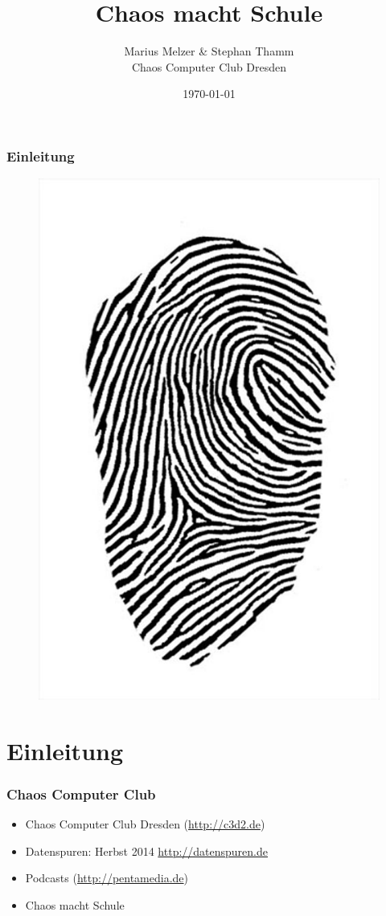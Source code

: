 \documentclass[12pt]{beamer}
\title{Chaos macht Schule}
\author{\small Marius Melzer \& Stephan Thamm\\\large Chaos Computer Club Dresden}
\date{\today}
\begin{document}
\maketitle


\begin{frame}
  \frametitle{Einleitung}
  \begin{figure}
    \includegraphics[height=0.7\textheight]{img/fingerabdruck.jpg}
  \end{figure}
\end{frame}


\section{Einleitung}
\begin{frame}
    \frametitle{Chaos Computer Club}
    \begin{itemize}
      \item<1-> Chaos Computer Club Dresden (\url{http://c3d2.de})
          \note{}
      \item<2-> Datenspuren: Herbst 2014 \url{http://datenspuren.de}
      \item<3-> Podcasts (\url{http://pentamedia.de})
      \item<4-> Chaos macht Schule
    \end{itemize}
\end{frame}
\end{document}
